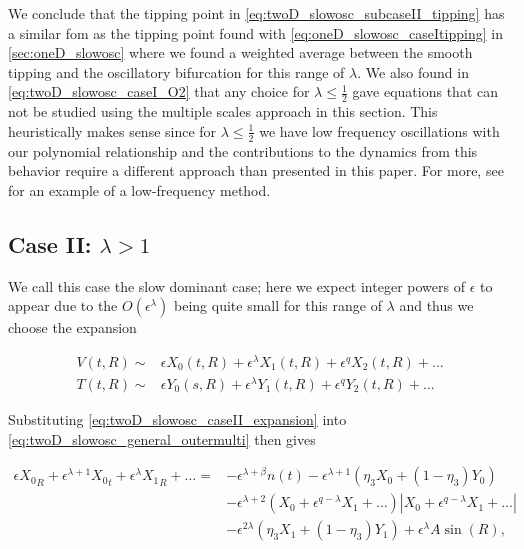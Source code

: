 We conclude that the tipping point in \eqref{eq:twoD_slowosc_subcaseII_tipping} has a similar fom as the tipping point found with \eqref{eq:oneD_slowosc_caseItipping} in \autoref{sec:oneD_slowosc} where we found a weighted average between the smooth tipping and the oscillatory bifurcation for this range of $\lambda$. We also found in \eqref{eq:twoD_slowosc_caseI_O2} that any choice for $\lambda\le\frac{1}{2}$ gave equations that can not be studied using the multiple scales approach in this section. This heuristically makes sense since for $\lambda\le \frac{1}{2}$ we have low frequency oscillations with our polynomial relationship and the contributions to the dynamics from this behavior require a different approach than presented in this paper. For more, see \cite{zhu2015tipping} for an example of a low-frequency method.

\subsection{Case II: $\lambda>1$}

We call this case the slow dominant case; here we expect integer powers of $\epsilon$ to appear due to the $O(\epsilon^\lambda)$ being quite small for this range of $\lambda$ and thus we choose the expansion 

\begin{equation}\label{eq:twoD_slowosc_caseII_expansion}
\begin{aligned}
V(t,R) \sim& \epsilon X_0(t,R)+\epsilon^\lambda X_1(t,R)+\epsilon^q X_2(t,R)+\ldots\\
T(t,R) \sim& \epsilon Y_0(s,R) + \epsilon^\lambda Y_1(t,R) +\epsilon^q Y_2(t,R)+\ldots
\end{aligned}
\end{equation}

Substituting \eqref{eq:twoD_slowosc_caseII_expansion} into \eqref{eq:twoD_slowosc_general_outermulti} then gives

\begin{equation*}
\begin{aligned}
\epsilon {X_0}_R+\epsilon^{\lambda+1}{X_0}_t+\epsilon^\lambda {X_1}_R+\ldots={} & -\epsilon^{\lambda+\beta}n(t)-\epsilon^{\lambda+1} (\eta_3X_0+(1-\eta_3)Y_0) \\
&-\epsilon^{\lambda+2}(X_0+\epsilon^{q-\lambda} X_1+\ldots)|X_0+\epsilon^{q-\lambda} X_1+\ldots|\\
& - \epsilon^{2\lambda}(\eta_3X_1+(1-\eta_3)Y_1) + \epsilon^\lambda A\sin(R),
\end{aligned}
\end{equation*}

